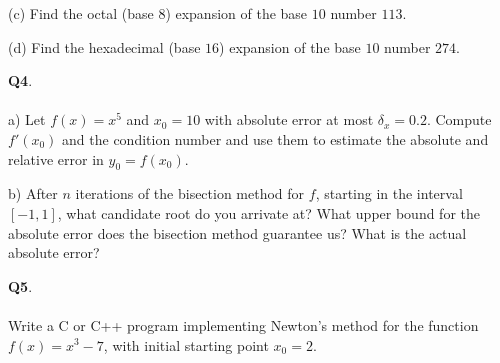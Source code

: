 \documentclass[12pt, oneside]{amsart}
\begin{document}
\vspace{2in}

\noindent
(c) Find the octal (base $8$) expansion of the base $10$ number $113$. 

\vspace{2in}

\noindent
(d) Find the hexadecimal (base $16$) expansion of the base $10$ number $274$. 

\newpage
\noindent
\textbf{Q4}. \\ \\ 
\noindent
a) Let $f(x)=x^5$ and $x_0=10$ with absolute error at most $\delta_x=0.2$. Compute $f'(x_0)$ and the condition number and use them to estimate 
the absolute and relative error in $y_0=f(x_0)$. 

\vspace{4in}

\noindent
b) After $n$ iterations of the bisection method for $f$, starting in the interval $[-1, 1]$, what candidate root do you arrivate at? What upper bound for the absolute error does the bisection method guarantee us? What is the actual absolute error?  

\newpage
\noindent

\noindent \textbf{Q5}. \\ \\ 
\noindent
Write a C or C++ program implementing Newton's method for the function $f(x) = x^3 -7$, with initial starting point $x_0 = 2$.    
\vspace{2in}
\end{document}

